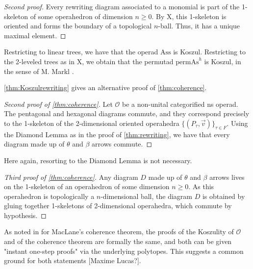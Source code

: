 \begin{proof}[Second proof] Every rewriting diagram associated to a monomial is part of the 1-skeleton of some operahedron of dimension $n\geq 0$. By X, this 1-skeleton is oriented and forms the boundary of a topological $n$-ball. Thus, it has a unique maximal element. 
\end{proof}

Restricting to linear trees, we have that the operad $\mathrm{Ass}$ is Koszul. Restricting to the 2-leveled trees as in X, we obtain that the permutad $\mathrm{permAs}^h$ is Koszul, in the sense of M. Markl \cite[Definition 21]{Markl19}.

\medskip

\cref{thm:Koszulrewriting} gives an alternative proof of \cref{thm:coherence}. 

\begin{proof}[Second proof of {\cref{thm:coherence}}] Let $\mathcal{O}$ be a non-unital categorified ns operad. The pentagonal and hexagonal diagrams commute, and they correspond precisely to the 1-skeleton of the 2-dimensional oriented operahedra $\{(P_\tau,\vec v)\}_{\tau \in F}$. Using the Diamond Lemma as in the proof of \cref{thm:rewriting}, we have that every diagram made up of $\theta$ and $\beta$ arrows commute. 
\end{proof}

Here again, resorting to the Diamond Lemma is not necessary.

\begin{proof}[Third proof of {\cref{thm:coherence}}] Any diagram $D$ made up of $\theta$ and $\beta$ arrows lives on the 1-skeleton of an operahedron of some dimension $n\geq 0$. As this operahedron is topologically a $n$-dimensional ball, the diagram $D$ is obtained by gluing together 1-skeletons of 2-dimensional operahedra, which commute by hypothesis.
\end{proof}

As noted in \cite[Remark p.266]{LodayVallette12} for MacLane's coherence theorem, the proofs of the Koszulity of $\mathcal{O}$ and of the coherence theorem are formally the same, and both can be given "instant one-step proofs" via the underlying polytopes. This suggests a common ground for both statements [Maxime Lucas?].